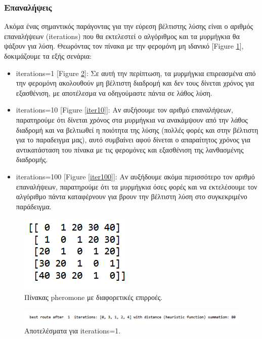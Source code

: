 \subsubsection{Επαναλήψεις}
Ακόμα ένας σημαντικός παράγοντας για την εύρεση βέλτιστης λύσης είναι ο αριθμός επαναλήψεων (iterations) που θα εκτελεστεί ο αλγόριθμος και τα μυρμήγκια θα ψάξουν για λύση. Θεωρόντας τον πίνακα με την φερομόνη μη ιδανικό [Figure \ref{pher2}], δοκιμάζουμε τα εξής σενάρια:
\begin{itemize}
    \item iterations=1 [Figure \ref{iter1}]:
    Σε αυτή την περίπτωση, τα μυρμήγκια επιρεασμένα από την φερομόνη ακολουθούν μη βέλτιστη διαδρομή και δεν τους δίνεται χρόνος για εξασθένιση, με αποτέλεσμα να οδηγούμαστε πάντα σε λάθος λύση.
    \item iterations=10 [Figure \ref{iter10}]:
    Αν αυξήσουμε τον αριθμό επαναλήψεων, παρατηρούμε ότι δίνεται χρόνος στα μυρμήγκια να ανακάμψουν από την λάθος διαδρομή και να βελτιωθεί η ποιότητα της λύσης (πολλές φορές και στην βέλτιστη για το παραδειγμα μας), αυτό συμβαίνει αφού δίνεται ο απαραίτητος χρόνος για αντικατάσταση του πίνακα με τις φερομόνες και εξασθένιση της λανθασμένης διαδρομής.
    \item iterations=100 [Figure \ref{iter100}]:
    Αν αυξήδουμε ακόμα περισσότερο τον αριθμό επαναλήψεων, παρατηρούμε ότι τα μυρμήγκια όσες φορές και να εκτελέσουμε τον αλγόριθμο πάντα καταφέρνουν για βρουν την βέλτιστη λύση στο συγκεκριμένο παράδειγμα.
\end{itemize}
\begin{figure}
    \centering
    \includegraphics[scale=1]{2947_thesis/pictures/pheromone2.png} 
    \caption{Πίνακας pheromone με διαφορετικές επιρροές.}
    \label{pher2}
\end{figure}
\begin{figure}
    \centering
    \includegraphics[scale=0.55]{2947_thesis/pictures/ex4.png} 
    \caption{Αποτελέσματα για iterations=1.}
    \label{iter1}
\end{figure}

